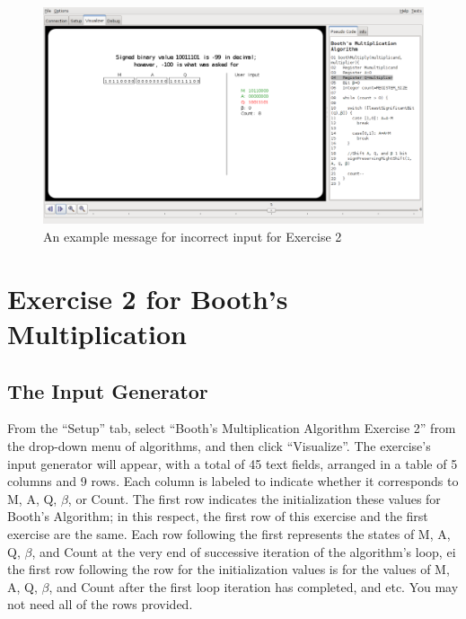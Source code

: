 \documentclass{article}
\begin{document}
\pagebreak

\begin{figure}[h]
\centering
\includegraphics[scale=0.4]{ex1incorrect.pdf}
\caption{An example message for incorrect input for Exercise 2}
\end{figure}

\pagebreak

\section{Exercise 2 for Booth's Multiplication}
\subsection{The Input Generator}
From the ``Setup'' tab, select ``Booth's Multiplication Algorithm Exercise 2'' from the drop-down menu of algorithms, and then click ``Visualize''.
The exercise's input generator will appear, with a total of 45 text fields, arranged in a table of 5 columns and 9 rows.
Each column is labeled to indicate whether it corresponds to M, A, Q, $\beta$, or Count.
The first row indicates the initialization these values for Booth's Algorithm; in this respect, the first row of this exercise and the first exercise are the same.
Each row following the first represents the states of M, A, Q, $\beta$, and Count at the very end of successive iteration of the algorithm's loop, ei the first row following the row for the initialization values is for the values of M, A, Q, $\beta$, and Count after the first loop iteration has completed, and etc.
You may not need all of the rows provided.
\end{document}
